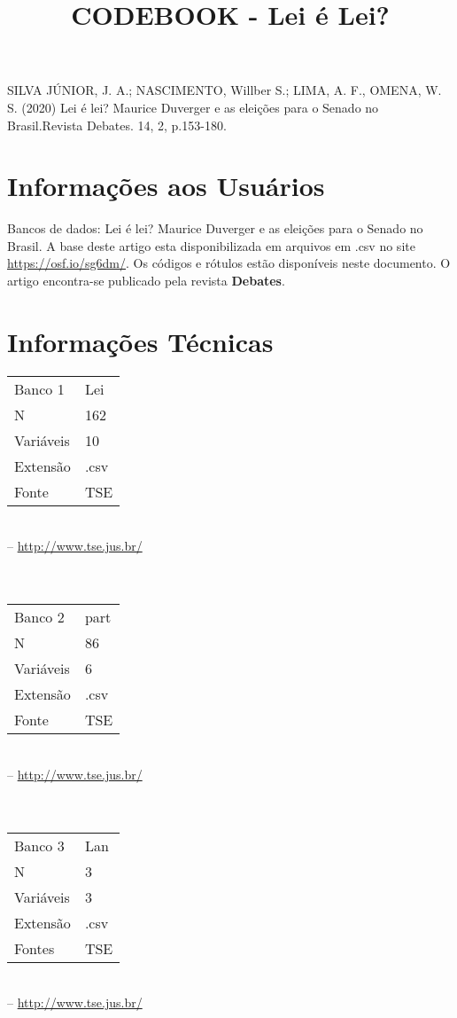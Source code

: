 \documentclass{article}\usepackage[]{graphicx}\usepackage[]{color}
\title{\textbf{CODEBOOK - Lei é Lei?}}
\author{}
\date{ }
\begin{document}
\maketitle

\noindent SILVA JÚNIOR, J. A.; NASCIMENTO, Willber S.; LIMA, A. F., OMENA, W. S. (2020)
Lei é lei? Maurice Duverger e as eleições para o Senado no Brasil.Revista Debates. 14, 2, p.153-180.

\tableofcontents
\pagebreak


	\section{Informações aos Usuários}
	Bancos de dados: Lei é lei? Maurice Duverger e as eleições para o Senado no Brasil.
	A base deste artigo esta disponibilizada em arquivos em .csv no site {\color{red}\url{https://osf.io/sg6dm/}}. Os códigos e rótulos estão disponíveis neste documento. O artigo encontra-se publicado pela revista \textbf{Debates}.


	\section{Informações Técnicas}
	\begin{tabular}{p{3cm} p{10cm}}
		Banco 1     & Lei \\
		N           &  162 \\
		Variáveis   &  10 \\
		Extensão    & .csv \\
		Fonte       & TSE  \\
	\end{tabular} \\
   -- {\color{blue}\url{http://www.tse.jus.br/}}
 \\ \\ \\
	\begin{tabular}{p{3cm} p{10cm}}
		Banco 2      & part \\
		N           &  86 \\
		Variáveis   &  6 \\
		Extensão    & .csv \\
		Fonte       & TSE
	\end{tabular} \\
-- {\color{blue}\url{http://www.tse.jus.br/}} \\
\\ \\
	\begin{tabular}{p{3cm} p{10cm}}
		Banco 3     & Lan \\
		N           &  3 \\
		Variáveis   &  3 \\
		Extensão    & .csv \\
		Fontes      &  TSE 	\end{tabular} \\
	-- {\color{blue}\url{http://www.tse.jus.br/}} \\
\end{document}
